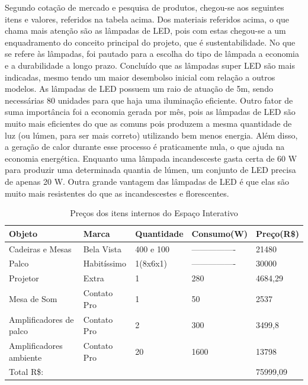 Segundo cotação de mercado e pesquisa de produtos, chegou-se aos seguintes itens e valores, referidos na tabela acima. Dos materiais referidos acima, o que chama mais atenção são as lâmpadas de LED, pois com estas chegou-se a um enquadramento do conceito principal do projeto, que é sustentabilidade. No que se refere às lâmpadas, foi pautado para a escolha do tipo de lâmpada a economia e a durabilidade a longo prazo. Concluído que as lâmpadas super LED são mais indicadas, mesmo tendo um maior desembolso inicial com relação a outros modelos. As lâmpadas de LED possuem um raio de atuação de 5m, sendo necessárias 80 unidades para que haja uma iluminação eficiente. Outro fator de suma importância foi a economia gerada por mês, pois as lâmpadas de LED são muito mais eficientes do que as comuns pois produzem a mesma quantidade de luz (ou lúmen, para ser mais correto) utilizando bem menos energia. Além disso, a geração de calor durante esse processo é praticamente nula, o que ajuda na economia energética. Enquanto uma lâmpada incandesceste gasta certa de 60 W para produzir uma determinada quantia de lúmen, um conjunto de LED precisa de apenas 20 W. Outra grande vantagem das lâmpadas de LED é que elas são muito mais resistentes do que as incandescestes e florescentes.
\begin{table}[h]
\centering
\caption{Preços dos itens internos do Espaço Interativo}
\label{PrecoInternoEspacoInterativo}
\begin{tabular}{|l|l|l|l|l|}
\hline
Objeto                  & Marca       & Quantidade & Consumo(W)       & Preço(R\$) \\ \hline
Cadeiras e Mesas        & Bela Vista  & 400 e 100  & ---------------- & 21480      \\ \hline
Palco                   & Habitíssimo & 1(8x6x1)   & ---------------- & 30000      \\ \hline
Projetor                & Extra       & 1          & 280              & 4684,29    \\ \hline
Mesa de Som             & Contato Pro & 1          & 50               & 2537       \\ \hline
Amplificadores de palco & Contato Pro & 2          & 300              & 3499,8     \\ \hline
Amplificadores ambiente & Contato Pro & 20         & 1600             & 13798      \\ \hline
Total R\$:              &             &            &                  & 75999,09   \\ \hline
\end{tabular}
\end{table}

